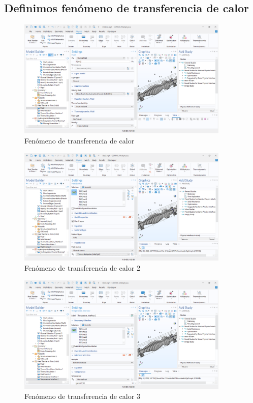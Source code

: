 \documentclass{article}
\theoremstyle{mytheoremstyle}
\theoremstyle{mytheoremstyle}
\theoremstyle{myproblemstyle}
\begin{document}
  \subsection{Definimos fenómeno de transferencia de calor}
            \begin{figure}[H]
              \centering
              \includegraphics[width=0.9\textwidth]{fen.png}
              \caption{Fenómeno de transferencia de calor}
              \label{fig:comsol_fen_transf_calor_1} %
            \end{figure}
            \begin{figure}[H]
              \centering
              \includegraphics[width=0.9\textwidth]{fen2.png}
              \caption{Fenómeno de transferencia de calor 2}
              \label{fig:comsol_fen_transf_calor_2} %
            \end{figure}
     \begin{figure}[H]
              \centering
              \includegraphics[width=0.9\textwidth]{fen3.png}
              \caption{Fenómeno de transferencia de calor 3}
              \label{fig:comsol_fen_transf_calor_3} %
            \end{figure}
\end{document}

